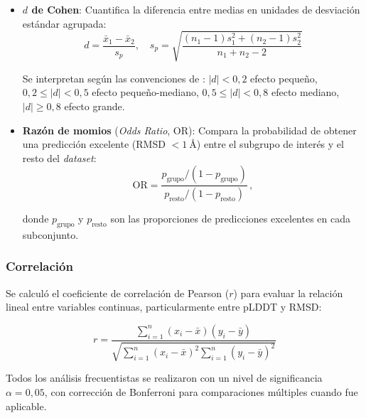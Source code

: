 \begin{itemize}
    \item \textbf{$d$ de Cohen}: Cuantifica la diferencia entre medias en unidades de desviaci\'on est\'andar agrupada:
    \begin{equation}
        d = \frac{\bar{x}_1 - \bar{x}_2}{s_p}, \quad s_p = \sqrt{\frac{(n_1 - 1)s_1^2 + (n_2 - 1)s_2^2}{n_1 + n_2 - 2}}
        \label{eq:cohen_d}
    \end{equation}

    Se interpretan seg\'un las convenciones de \citet{cohen1988statistical}: $|d| < 0,2$ efecto peque\~no, $0,2 \leq |d| < 0,5$ efecto peque\~no-mediano, $0,5 \leq |d| < 0,8$ efecto mediano, $|d| \geq 0,8$ efecto grande.

    \item \textbf{Raz\'on de momios} (\textit{Odds Ratio}, OR): Compara la probabilidad de obtener una predicci\'on excelente (RMSD $< \SI{1}{\angstrom}$) entre el subgrupo de inter\'es y el resto del \textit{dataset}:
    \begin{equation}
        \text{OR} = \frac{p_{\text{grupo}} / (1 - p_{\text{grupo}})}{p_{\text{resto}} / (1 - p_{\text{resto}})}\,,
        \label{eq:odds_ratio}
    \end{equation}

    \noindent donde $p_{\text{grupo}}$ y $p_{\text{resto}}$ son las proporciones de predicciones excelentes en cada subconjunto.
\end{itemize}

\subsubsection{Correlaci\'on}

Se calcul\'o el coeficiente de correlaci\'on de Pearson ($r$) para evaluar la relaci\'on lineal entre variables continuas, particularmente entre pLDDT y RMSD:

\begin{equation}
    r = \frac{\sum_{i=1}^{n}(x_i - \bar{x})(y_i - \bar{y})}{\sqrt{\sum_{i=1}^{n}(x_i - \bar{x})^2 \sum_{i=1}^{n}(y_i - \bar{y})^2}}
    \label{eq:pearson}
\end{equation}

Todos los an\'alisis frecuentistas se realizaron con un nivel de significancia $\alpha = 0,05$, con correcci\'on de Bonferroni para comparaciones m\'ultiples cuando fue aplicable.


